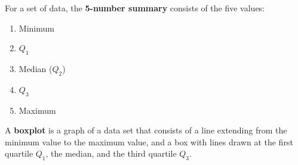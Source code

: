 \documentclass[handout]{beamer}
\begin{document}
\begin{frame}
\begin{definition}
For a set of data, the \textbf{5-number summary} consists of the five values:
\begin{enumerate}
\item Minimum
\item $Q_1$
\item Median ($Q_2$)
\item $Q_3$
\item Maximum
\end{enumerate}
\end{definition}\pause

\begin{definition}
A \textbf{boxplot} is a graph of a data set that consists of a line extending from the minimum value to the maximum value, and a box with lines drawn at the first quartile $Q_1$, the median, and the third quartile $Q_3$.

\vspace{-2mm}
\begin{center}
\end{center}
\end{definition}
\end{frame}
\end{document}
